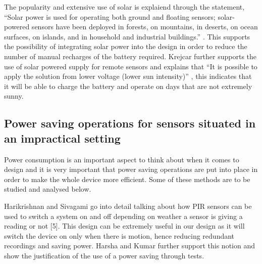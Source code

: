 \documentclass[class=report,11pt,crop=false]{standalone}
\begin{document}
The popularity and extensive use of solar is explaiend through the statement, “Solar power is used for operating both ground and floating sensors; solar-powered sensors have been deployed in forests, on mountains, in deserts, on ocean surfaces, on islands, and in household and industrial buildings.” \cite{dewan2014alternative}. This supports the possibility of integrating solar power into the design in order to reduce the number of manual recharges of the battery required. Krejcar further supports the use of solar powered supply for remote sensors and explains that “It is possible to apply the solution from lower voltage (lower sun intensity)” \cite{krejcar2012optimized}, this indicates that it will be able to charge the battery and operate on days that are not extremely sunny.

\subsection{Power saving operations for sensors situated in an impractical setting}

Power consumption is an important aspect to think about when it comes to design and it is very important that power saving operations are put into place in order to make the whole device more efficient. Some of these methods are to be studied and analysed below.

Harikrishnan and Sivagami \cite{harikirshnan2017intelligent} go into detail talking about how PIR sensors can be used to switch a system on and off depending on weather a sensor is giving a reading or not [5]. This design can be extremely useful in our design as it will switch the device on only when there is motion, hence reducing redundant recordings and saving power. Harsha and Kumar \cite{harsha2020home} further support this notion and show the justification of the use of a power saving through tests.

\ifstandalone

\printnoidxglossary[type=\acronymtype,nonumberlist]
\fi
\end{document}
